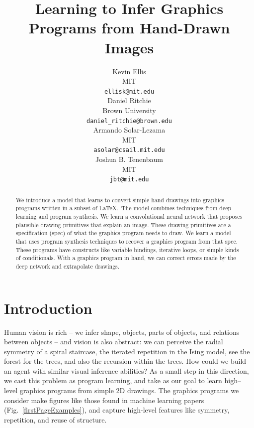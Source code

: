 \documentclass{article}
\title{Learning to Infer Graphics Programs from Hand-Drawn Images}
\author{Kevin Ellis\\MIT\\\texttt{ellisk@mit.edu}\\
 \And
 Daniel Ritchie\\Brown University\\\texttt{daniel\_ritchie@brown.edu}\\
 \AND
 Armando Solar-Lezama\\MIT\\\texttt{asolar@csail.mit.edu}\\
 \And
 Joshua B. Tenenbaum \\MIT\\\texttt{jbt@mit.edu}\\
}
\theoremstyle{definition}
\begin{document}

\maketitle

\begin{abstract}
  We introduce a model that learns to convert simple hand drawings
  into graphics programs written in a subset of \LaTeX.~The model
  combines techniques from deep learning and program synthesis.  We
  learn a convolutional neural network that proposes plausible drawing
  primitives that explain an image. These drawing primitives are a
  specification (spec) of what the graphics program needs to draw.  We
  learn a model that uses program synthesis techniques to recover a
  graphics program from that spec. These programs have constructs like
  variable bindings, iterative loops, or simple kinds of
  conditionals. With a graphics program in hand, we can correct errors
  made by the deep network and extrapolate drawings.
\end{abstract}

\section{Introduction}

Human vision is rich -- we infer shape, objects, parts of objects,
and relations between objects -- and vision is also abstract:
we can perceive the radial symmetry of a spiral staircase,
the iterated repetition in the Ising model,
see the forest for the trees, and also the recursion within the trees.
How could we build an agent with similar visual inference abilities?
As a small step in this direction, 
we cast this problem as program learning,
and take as our goal to learn high--level
graphics programs from simple 2D drawings.
The graphics programs we consider make figures like those found in machine learning papers
(Fig.~\ref{firstPageExamples}),
and capture high-level features like %
symmetry, repetition, and reuse of structure.

\end{document}
